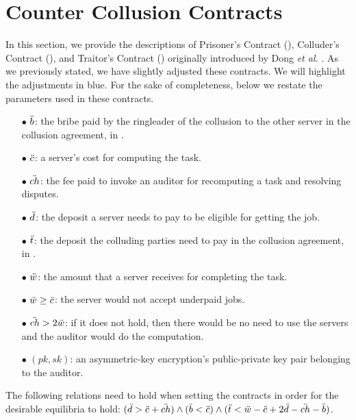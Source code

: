 

\section{Counter Collusion Contracts}\label{appendix::Counter-Collusion-Contracts}

In this section, we provide the descriptions of Prisoner’s Contract (\SCpc), Colluder’s Contract (\SCcc), and Traitor’s Contract (\SCtc) originally introduced by Dong \textit{et al.} \cite{dong2017betrayal}. As we previously stated, we have slightly adjusted these contracts.  We will highlight the adjustments in blue. For the sake of completeness, below we restate the parameters used in these contracts. 


\begin{itemize}
\item[$\bullet$] $\ddot{b}$: the bribe paid by the ringleader of the collusion to the other
server in the collusion agreement, in \SCcc.
%
\item[$\bullet$] $\ddot{c}$: a server’s cost for computing the task.
%
\item[$\bullet$] $\ddot{ch}$: the fee paid to invoke an auditor for recomputing a task and resolving
disputes.
%
\item[$\bullet$] $\ddot{d}$: the deposit a server needs to pay to be eligible for getting the job.
%
\item[$\bullet$] $\ddot{t}$: the deposit the colluding parties need to pay in the collusion agreement, in \SCcc.
%
\item[$\bullet$] $\ddot{w}$: the amount that a server receives for completing the task.
%
\item[$\bullet$] $\ddot{w} \geq \ddot{c}$: the server would not accept underpaid jobs.
%
\item[$\bullet$] $\ddot{ch} > 2\ddot{w}$: if it does not hold, then there would be no need to use the servers and the auditor would do the computation.
%
\item [$\bullet$] $(pk,sk)$: an asymmetric-key encryption's public-private key pair belonging to the auditor. 
\end{itemize}
\noindent The following relations need to hold when setting the contracts
in order for the desirable equilibria to hold: 
%
 $(\ddot{d}>\ddot{c}+\ddot{ch}) \wedge (\ddot{b}<\ddot{c}) \wedge (\ddot{t}<\ddot{w}-\ddot{c} + 2\ddot{d} - \ddot{ch} -\ddot{b})$.











